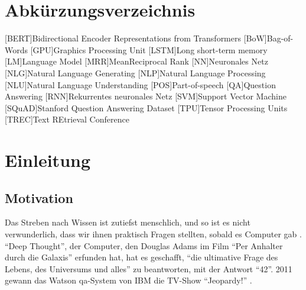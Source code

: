 \documentclass[
        ngerman,
        paper=a4,
        numbers=noendperiod,
]{scrreprt}
\begin{document}
\chapter*{Abkürzungsverzeichnis}
\begin{acronym}
[BERT]{Bidirectional Encoder Representations from Transformers}
[BoW]{Bag-of-Words}
[GPU]{Graphics Processing Unit}
[LSTM]{Long short-term memory}
[LM]{Language Model}
[MRR]{MeanReciprocal Rank}
[NN]{Neuronales Netz}
[NLG]{Natural Language Generating}
[NLP]{Natural Language Processing}
[NLU]{Natural Language Understanding}
[POS]{Part-of-speech}
[QA]{Question Answering}
[RNN]{Rekurrentes neuronales Netz}
[SVM]{Support Vector Machine}
[SQuAD]{Stanford Question Answering Dataset}
[TPU]{Tensor Processing Units}
[TREC]{Text REtrieval Conference}



\end{acronym}
\clearpage 
{} 
\listofxequations
\clearpage
\clearpage
\setcounter{page}{1}


\chapter{Einleitung}
\section{Motivation}
Das Streben nach Wissen ist zutiefst menschlich, und so ist es nicht verwunderlich, dass wir ihnen praktisch Fragen stellten, sobald es Computer gab \citep[S. 466]{Jurafsky2014SpeechProcessing}. \enquote{Deep Thought}, der Computer, den Douglas Adams im Film \enquote{Per Anhalter durch die Galaxis} erfunden hat, hat es geschafft, \enquote{die ultimative Frage des Lebens, des Universums und alles} zu beantworten, mit der Antwort \enquote{42}. 2011 gewann das Watson \ac{qa}-System von IBM die TV-Show \enquote{Jeopardy!} \citep{Markoff2011ComputerNot}. 
\end{document}
